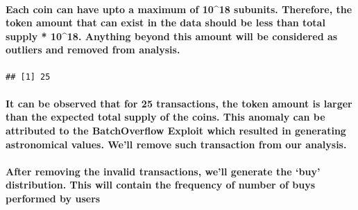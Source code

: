 \documentclass[]{article}
\newenvironment{Shaded}{\begin{snugshade}}{\end{snugshade}}
\newcommand{\KeywordTok}[1]{\textcolor[rgb]{0.13,0.29,0.53}{\textbf{#1}}}
\newcommand{\DecValTok}[1]{\textcolor[rgb]{0.00,0.00,0.81}{#1}}
\newcommand{\StringTok}[1]{\textcolor[rgb]{0.31,0.60,0.02}{#1}}
\newcommand{\OperatorTok}[1]{\textcolor[rgb]{0.81,0.36,0.00}{\textbf{#1}}}
\newcommand{\NormalTok}[1]{#1}
\let\oldparagraph\paragraph
\renewcommand{\paragraph}[1]{\oldparagraph{#1}\mbox{}}
\begin{document}
\paragraph{Each coin can have upto a maximum of 10\^{}18 subunits.
Therefore, the token amount that can exist in the data should be less
than total supply * 10\^{}18. Anything beyond this amount will be
considered as outliers and removed from
analysis.}\label{each-coin-can-have-upto-a-maximum-of-1018-subunits.-therefore-the-token-amount-that-can-exist-in-the-data-should-be-less-than-total-supply-1018.-anything-beyond-this-amount-will-be-considered-as-outliers-and-removed-from-analysis.}

\begin{Shaded}
\end{Shaded}

\begin{verbatim}
## [1] 25
\end{verbatim}

\paragraph{It can be observed that for 25 transactions, the token amount
is larger than the expected total supply of the coins. This anomaly can
be attributed to the BatchOverflow Exploit which resulted in generating
astronomical values. We'll remove such transaction from our
analysis.}\label{it-can-be-observed-that-for-25-transactions-the-token-amount-is-larger-than-the-expected-total-supply-of-the-coins.-this-anomaly-can-be-attributed-to-the-batchoverflow-exploit-which-resulted-in-generating-astronomical-values.-well-remove-such-transaction-from-our-analysis.}

\paragraph{\texorpdfstring{After removing the invalid transactions,
we'll generate the `buy' distribution. This will contain the frequency
of number of buys performed by
users}{After removing the invalid transactions, we'll generate the buy distribution. This will contain the frequency of number of buys performed by users}}\label{after-removing-the-invalid-transactions-well-generate-the-buy-distribution.-this-will-contain-the-frequency-of-number-of-buys-performed-by-users}
\end{document}
